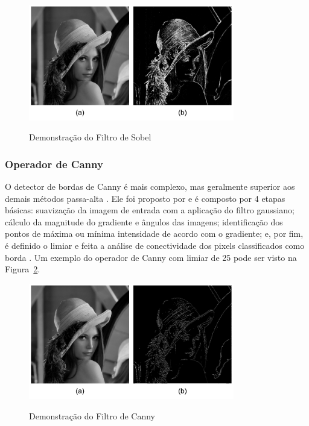 \documentclass[12pt,oneside,a4paper,english,french,spanish,brazil,]{abntex2}
\begin{document}
\begin{figure}[ht]
\centering
\caption{Demonstração do Filtro de Sobel}
\includegraphics[width=0.8\textwidth]{imagens/PDI_Sobel.pdf}
\sourceAuthor
\label{fig:PDI_Sobel}
\end{figure}

\subsubsection{Operador de Canny}

O detector de bordas de Canny é mais complexo, mas geralmente superior aos demais métodos passa-alta \cite{gonzalez:2012}. Ele foi proposto por \citet{canny:1987} e é composto por 4 etapas básicas: suavização da imagem de entrada com a aplicação do filtro gaussiano; cálculo da magnitude do gradiente e ângulos das imagens; identificação dos pontos de máxima ou mínima intensidade de acordo com o gradiente; e, por fim, é definido o limiar e feita a análise de conectividade dos pixels classificados como borda \cite{gonzalez:2012}. Um exemplo do operador de Canny com limiar de 25 pode ser visto na Figura~\ref{fig:PDI_Canny}.

\begin{figure}[ht]
\centering
\caption{Demonstração do Filtro de Canny}
\includegraphics[width=0.8\textwidth]{imagens/PDI_Canny.pdf}
\sourceAuthor
\label{fig:PDI_Canny}
\end{figure}
\end{document}
